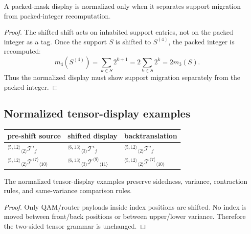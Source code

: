 \begin{proposition}
\label{prop:v404-packed-mask-display-normalization}
A packed-mask display is normalized only when it separates support migration
from packed-integer recomputation.
\end{proposition}

\begin{proof}
The shifted shift acts on inhabited support entries, not on the packed integer as a
tag. Once the support $S$ is shifted to $S^{(4)}$, the packed integer is
recomputed:
\[
 m_4(S^{(4)})=\sum_{k\in S}2^{k+1}=2\sum_{k\in S}2^k=2m_3(S).
\]
Thus the normalized display must show support migration separately from the
packed integer.
\end{proof}

\subsection{Normalized tensor-display examples}
\label{subsec:v404-normalized-tensor-display-examples}

\begin{center}
\scriptsize
\setlength{\tabcolsep}{2pt}
\begin{tabular}{@{}p{}P{0.30\textwidth}P{0.30\textwidth}@{}}
\toprule
pre-shift source & shifted display & backtranslation\\
\midrule
${}^{\langle5,12\rangle}{}_{\langle2\rangle}\mathcal T^{i}{}_{j}$
&
${}^{\langle6,13\rangle}{}_{\langle3\rangle}\mathcal T^{i}{}_{j}$
&
${}^{\langle5,12\rangle}{}_{\langle2\rangle}\mathcal T^{i}{}_{j}$
\\[0.5em]
${}^{\langle5,12\rangle}{}_{\langle2\rangle}\mathcal T^{\langle7\rangle}{}_{\langle10\rangle}$
&
${}^{\langle6,13\rangle}{}_{\langle3\rangle}\mathcal T^{\langle8\rangle}{}_{\langle11\rangle}$
&
${}^{\langle5,12\rangle}{}_{\langle2\rangle}\mathcal T^{\langle7\rangle}{}_{\langle10\rangle}$
\\
\bottomrule
\end{tabular}
\end{center}

\begin{lemma}
\label{lem:v404-tensor-display-normalization-preserves-grammar}
The normalized tensor-display examples preserve sidedness, variance,
contraction rules, and same-variance comparison rules.
\end{lemma}

\begin{proof}
Only QAM/router payloads inside index positions are shifted. No index is moved
between front/back positions or between upper/lower variance. Therefore the
two-sided tensor grammar is unchanged.
\end{proof}

